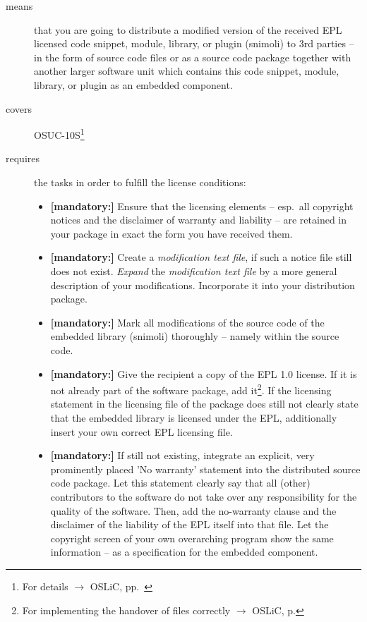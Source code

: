 \begin{description}
\item[means] that you are going to distribute a modified version of the received
EPL licensed code snippet, module, library, or plugin (snimoli) to 3rd parties
-- in the form of source code files or as a source code package together with
another larger software unit which contains this code snippet, module, library,
or plugin as an embedded component.
\item[covers] OSUC-10S\footnote{For details $\rightarrow$ OSLiC, pp.\
\pageref{OSUC-10S-DEF}}
\item[requires] the tasks in order to fulfill the license conditions:
\begin{itemize}

  \item \textbf{[mandatory:]} Ensure that the licensing elements -- esp.\ all
  copyright notices and the disclaimer of warranty and liability -- are retained
  in your package in exact the form you have received them.

  \item \textbf{[mandatory:]} Create a \emph{modification text file}, if such a
  notice file still does not exist. \emph{Expand} the \emph{modification text
  file} by a more general description of your modifications. Incorporate it into
  your distribution package.
  
  \item \textbf{[mandatory:]} Mark all modifications of the source code of the
  embedded library (snimoli) thoroughly -- namely within the source code.
   
  \item \textbf{[mandatory:]} Give the recipient a copy of the EPL 1.0 license.
  If it is not already part of the software package, add it\footnote{For
  implementing the handover of files correctly $\rightarrow$ OSLiC, p.
  \pageref{DistributingFilesHint}}. If the licensing statement in the licensing
  file of the package does still not clearly state that the embedded library is
  licensed under the EPL, additionally insert your own correct EPL licensing file.

  \item \textbf{[mandatory:]} If still not existing, integrate an explicit, very
  prominently placed 'No warranty' statement into the distributed source code
  package. Let this statement clearly say that all (other) contributors to the
  software do not take over any responsibility for the quality of the software.
  Then, add the no-warranty clause and the disclaimer of the liability of the
  EPL itself into that file. Let the copyright screen of your own overarching
  program show the same information -- as a specification for the embedded
  component.
     

\end{itemize}
\end{description}
